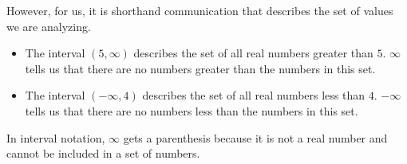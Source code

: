 \documentclass{ximera}
\begin{document}
However, for us, it is shorthand communication that describes the set of values we are analyzing.







\begin{example}


\begin{itemize}
\item The interval $(5, \infty)$ describes the set of all real numbers greater than $5$.  $\infty$ tells us that there are no numbers greater than the numbers in this set.



\item The interval $(-\infty, 4)$ describes the set of all real numbers less than $4$.  $-\infty$ tells us that there are no numbers less than the numbers in this set.
\end{itemize}




\end{example}
In interval notation, $\infty$ gets a parenthesis because it is not a real number and cannot be included in a set of numbers.
\end{document}
